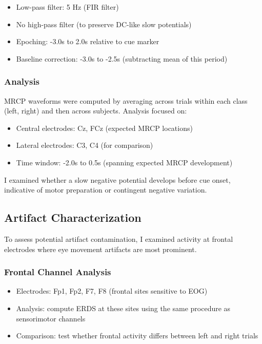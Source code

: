 \begin{itemize}
    \item Low-pass filter: 5 Hz (FIR filter)
    \item No high-pass filter (to preserve DC-like slow potentials)
    \item Epoching: -3.0s to 2.0s relative to cue marker
    \item Baseline correction: -3.0s to -2.5s (subtracting mean of this period)
\end{itemize}

\subsubsection{Analysis}

MRCP waveforms were computed by averaging across trials within each class (left, right) and then across subjects. Analysis focused on:

\begin{itemize}
    \item Central electrodes: Cz, FCz (expected MRCP locations)
    \item Lateral electrodes: C3, C4 (for comparison)
    \item Time window: -2.0s to 0.5s (spanning expected MRCP development)
\end{itemize}

I examined whether a slow negative potential develops before cue onset, indicative of motor preparation or contingent negative variation.


\subsection{Artifact Characterization}
\label{subsec:methods_artifact_char}

To assess potential artifact contamination, I examined activity at frontal electrodes where eye movement artifacts are most prominent.

\subsubsection{Frontal Channel Analysis}

\begin{itemize}
    \item Electrodes: Fp1, Fp2, F7, F8 (frontal sites sensitive to EOG)
    \item Analysis: compute ERDS at these sites using the same procedure as sensorimotor channels
    \item Comparison: test whether frontal activity differs between left and right trials
\end{itemize}

